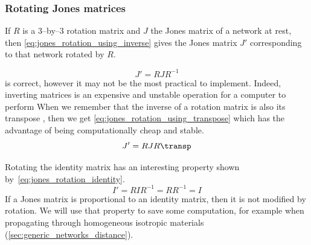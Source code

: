 \subsubsection{Rotating Jones matrices}
\label{sec:rotating_jones_matrices}
If $R$ is a 3--by--3 rotation matrix and $J$ the Jones matrix of a network at rest,
then \cref{eq:jones_rotation_using_inverse} gives the Jones matrix $J'$ corresponding to that network rotated by $R$.

\begin{equation}
    J' = R J R^{-1}
    \label{eq:jones_rotation_using_inverse}
\end{equation}
 is correct, however it may not be the most practical to implement.
Indeed, inverting matrices is an expensive and unstable operation for a computer to perform
When we remember that the inverse of a rotation matrix is also its transpose%
,
then we get \cref{eq:jones_rotation_using_transpose} which has the advantage of being computationally cheap and stable.
\begin{equation}
    J' = R J R\transp
    \label{eq:jones_rotation_using_transpose}
\end{equation}

Rotating the identity matrix has an interesting property shown by~\eqref{eq:jones_rotation_identity}.
\begin{equation}
    I' = R I R^{-1}
       = R R^{-1}
       = I
    \label{eq:jones_rotation_identity}
\end{equation}
If a Jones matrix is proportional to an identity matrix, then it is not modified by rotation.
We will use that property to save some computation, for example when propagating through homogeneous isotropic materials (\vref{sec:generic_networks_distance}).



